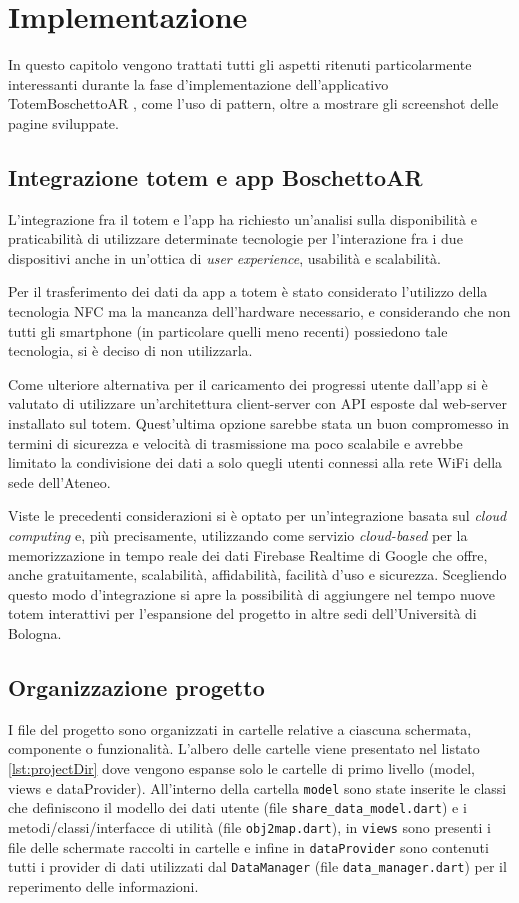 \chapter{Implementazione}
In questo capitolo vengono trattati tutti gli aspetti ritenuti particolarmente interessanti durante la fase d'implementazione dell'applicativo TotemBoschettoAR \cite{repoTotemBoschettoAR}, come l'uso di pattern, oltre a mostrare gli screenshot delle pagine sviluppate.

\section{Integrazione totem e app BoschettoAR}
L'integrazione fra il totem e l'app ha richiesto un'analisi sulla disponibilità e praticabilità di utilizzare determinate tecnologie per l'interazione fra i due dispositivi anche in un'ottica di \textit{user experience}, usabilità e scalabilità.

Per il trasferimento dei dati da app a totem è stato considerato l'utilizzo della tecnologia NFC ma la mancanza dell'hardware necessario, e considerando che non tutti gli smartphone (in particolare quelli meno recenti) possiedono tale tecnologia, si è deciso di non utilizzarla.

Come ulteriore alternativa per il caricamento dei progressi utente dall'app si è valutato di utilizzare un'architettura client-server con API esposte dal web-server installato sul totem. Quest'ultima opzione sarebbe stata un buon compromesso in termini di sicurezza e velocità di trasmissione ma poco scalabile e avrebbe limitato la condivisione dei dati a solo quegli utenti connessi alla rete WiFi della sede dell'Ateneo.

Viste le precedenti considerazioni si è optato per un'integrazione basata sul \textit{cloud computing} e, più precisamente, utilizzando come servizio \textit{cloud-based} per la memorizzazione in tempo reale dei dati Firebase Realtime di Google \cite{firebase} che offre, anche gratuitamente, scalabilità, affidabilità, facilità d'uso e sicurezza.
Scegliendo questo modo d'integrazione si apre la possibilità di aggiungere nel tempo nuove totem interattivi per l'espansione del progetto in altre sedi dell'Università di Bologna.

\section{Organizzazione progetto}
I file del progetto sono organizzati in cartelle relative a ciascuna schermata, componente o funzionalità. L'albero delle cartelle viene presentato nel listato \ref{lst:projectDir} dove vengono espanse solo le cartelle di primo livello (model, views e dataProvider). All'interno della cartella \texttt{model} sono state inserite le classi che definiscono il modello dei dati utente (file \texttt{share\_data\_model.dart}) e i metodi/classi/interfacce di utilità (file \texttt{obj2map.dart}), in \texttt{views} sono presenti i file delle schermate raccolti in cartelle e infine in \texttt{dataProvider} sono contenuti tutti i provider di dati utilizzati dal \texttt{DataManager} (file \texttt{data\_manager.dart}) per il reperimento delle informazioni.

